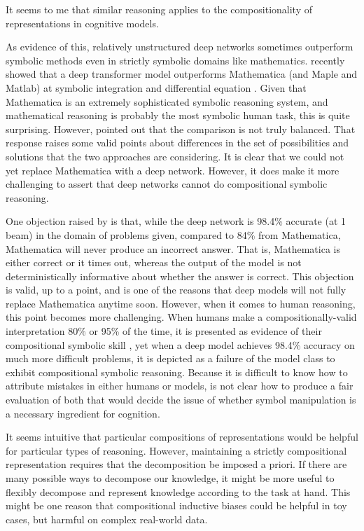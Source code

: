 It seems to me that similar reasoning applies to the compositionality of representations in cognitive models. \par
As evidence of this, relatively unstructured deep networks sometimes outperform symbolic methods even in strictly symbolic domains like mathematics. \citet{Lample2019} recently showed that a deep transformer model outperforms Mathematica (and Maple and Matlab) at symbolic integration and differential equation \citep{Lample2019}. Given that Mathematica is an extremely sophisticated symbolic reasoning system, and mathematical reasoning is probably the most symbolic human task, this is quite surprising. However, \citet{Davis2019} pointed out that the comparison is not truly balanced. That response raises some valid points about differences in the set of possibilities and solutions that the two approaches are considering. It is clear that we could not yet replace Mathematica with a deep network. However, it does make it more challenging to assert that deep networks cannot do compositional symbolic reasoning. \par
One objection raised by \citet{Davis2019} is that, while the deep network is 98.4\% accurate (at 1 beam) in the domain of problems given, compared to 84\% from Mathematica, Mathematica will never produce an incorrect answer. That is, Mathematica is either correct or it times out, whereas the output of the model is not deterministically informative about whether the answer is correct. This objection is valid, up to a point, and is one of the reasons that deep models will not fully replace Mathematica anytime soon. However, when it comes to human reasoning, this point becomes more challenging. When humans make a compositionally-valid interpretation 80\% or 95\% of the time, it is presented as evidence of their compositional symbolic skill \citep{Lake2019a}, yet when a deep model achieves 98.4\% accuracy on much more difficult problems, it is depicted as a failure of the model class to exhibit compositional symbolic reasoning. Because it is difficult to know how to attribute mistakes in either humans or models, is not clear how to produce a fair evaluation of both that would decide the issue of whether symbol manipulation is a necessary ingredient for cognition. \par 
It seems intuitive that particular compositions of representations would be helpful for particular types of reasoning. However, maintaining a strictly compositional representation requires that the decomposition be imposed a priori. If there are many possible ways to decompose our knowledge, it might be more useful to flexibly decompose and represent knowledge according to the task at hand. This might be one reason that compositional inductive biases could be helpful in toy cases, but harmful on complex real-world data.\par
